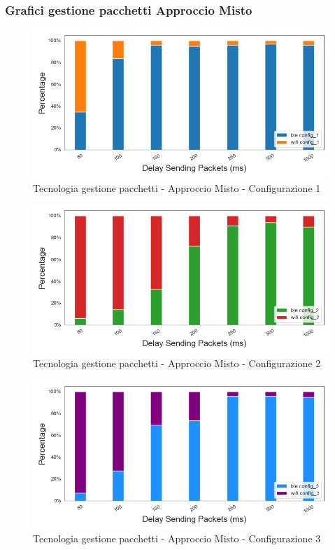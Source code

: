 \subsubsection{Grafici gestione pacchetti Approccio Misto}
\label{apex:grafici_packets}
\begin{figure}[hbt!]
    \centering
    \includegraphics[width = 1\textwidth]{images/graphs/myplot_config_1.png}
    \caption{Tecnologia gestione pacchetti - Approccio Misto - Configurazione 1}
    \label{graph:mixed_conf_1}
\end{figure}
\begin{figure}[hbt!]
    \centering
    \includegraphics[width = 1\textwidth]{images/graphs/myplot_config_2.png}
    \caption{Tecnologia gestione pacchetti - Approccio Misto - Configurazione 2}
    \label{graph:mixed_conf_2}
\end{figure}
\begin{figure}[hbt!]
    \centering
    \includegraphics[width = 1\textwidth]{images/graphs/myplot_config_3.png}
    \caption{Tecnologia gestione pacchetti - Approccio Misto - Configurazione 3}
    \label{graph:mixed_conf_3}
\end{figure}